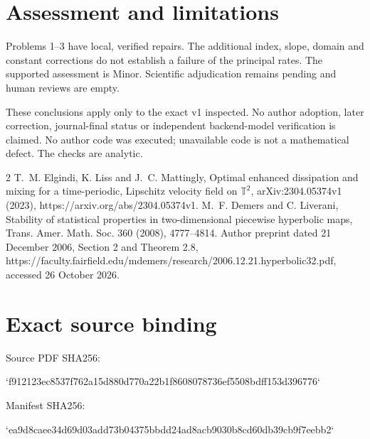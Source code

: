 \documentclass[10pt]{article}
\begin{document}
\section*{Assessment and limitations}
Problems 1–3 have local, verified repairs. The additional index, slope, domain and constant corrections do not establish a failure of the principal rates. The supported assessment is Minor. Scientific adjudication remains pending and human reviews are empty.\par
These conclusions apply only to the exact v1 inspected. No author adoption, later correction, journal-final status or independent backend-model verification is claimed. No author code was executed; unavailable code is not a mathematical defect. The checks are analytic.\par
2 T. M. Elgindi, K. Liss and J. C. Mattingly, Optimal enhanced dissipation and mixing for a time-periodic, Lipschitz velocity field on \(\mathbb T^2\), arXiv:2304.05374v1 (2023), https://arxiv.org/abs/2304.05374v1. M. F. Demers and C. Liverani, Stability of statistical properties in two-dimensional piecewise hyperbolic maps, Trans. Amer. Math. Soc. 360 (2008), 4777–4814. Author preprint dated 21 December 2006, Section 2 and Theorem 2.8, https://faculty.fairfield.edu/mdemers/research/2006.12.21.hyperbolic32.pdf, accessed 26 October 2026.\par
\section*{Exact source binding}
Source PDF SHA256:\par
`f912123ec8537f762a15d880d770a22b1f8608078736ef5508bdff153d396776`\par
Manifest SHA256:\par
`ea9d8caee34d69d03add73b04375bbdd24ad8acb9030b8cd60db39cb9f7eebb2`\par
\end{document}
